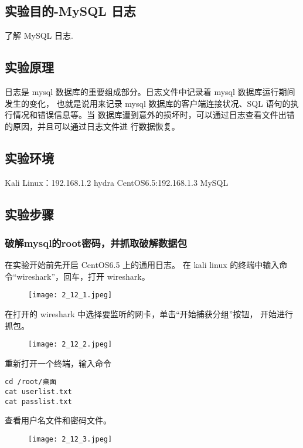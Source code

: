 \subsection{实验目的-MySQL 日志}
了解 MySQL 日志.
%
\subsection{实验原理}
日志是 mysql 数据库的重要组成部分。日志文件中记录着 mysql 数据库运行期间发生的变化，
也就是说用来记录 mysql 数据库的客户端连接状况、SQL 语句的执行情况和错误信息等。当
数据库遭到意外的损坏时，可以通过日志查看文件出错的原因，并且可以通过日志文件进
行数据恢复。
%
\subsection{实验环境}
Kali Linux：192.168.1.2 hydra
CentOS6.5:192.168.1.3 MySQL
%
\subsection{实验步骤}
\subsubsection{破解mysql的root密码，并抓取破解数据包}
在实验开始前先开启 CentOS6.5 上的通用日志。
在 kali linux 的终端中输入命令``wireshark''，回车，打开 wireshark。
\begin{figure}[H]
  \begin{center}
    \texttt{[image: 2\_12\_1.jpeg]}
  \end{center}
\end{figure}

在打开的 wireshark 中选择要监听的网卡，单击``开始捕获分组''按钮，
开始进行抓包。
\begin{figure}[H]
  \begin{center}
    \texttt{[image: 2\_12\_2.jpeg]}
  \end{center}
\end{figure}

重新打开一个终端，输入命令
\begin{verbatim}
cd /root/桌面
cat userlist.txt
cat passlist.txt
\end{verbatim}
查看用户名文件和密码文件。
\begin{figure}[H]
  \begin{center}
    \texttt{[image: 2\_12\_3.jpeg]}
  \end{center}
\end{figure}

